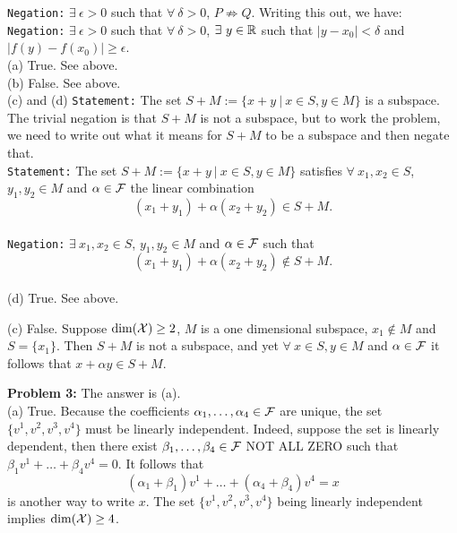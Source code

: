 \documentclass[letterpaper]{article}
\begin{document}
\texttt{Negation:} $ \exists~\epsilon>0$  such that  $\forall~\delta>0$, $P \not \Rightarrow Q$. Writing this out, we have:\\

\texttt{Negation:} $ \exists~\epsilon>0$  such that  $\forall~\delta>0$, $\exists~y\in \mathbb R$ such that $|y-x_0| < \delta$ and  $|f(y)-f(x_0)| \ge \epsilon$.\\

(a) True. See above.\\

(b) False.  See above. \\



(c) and (d)  \texttt{Statement:}  The set $S+M:=\{x+y~|~ x\in S, y \in M\}$ is a subspace. The trivial negation is that $S+M$ is not a subspace, but to work the problem, we need to write out what it means for $S+M$ to be a subspace and then negate that. \\

  \texttt{Statement:}  The set $S+M:=\{x+y~|~ x\in S, y \in M\}$ satisfies $\forall~x_1, x_2 \in S $, $y_1,y_2\in M$ and $\alpha\in {\cal F}$ the linear combination  $$(x_1+y_1) +\alpha (x_2+y_2)  \in S+M.$$\\

   \texttt{Negation:} $\exists~x_1, x_2 \in S $, $y_1,y_2\in M$ and $\alpha\in {\cal F}$ such that $$(x_1+y_1) +\alpha (x_2+y_2) \not \in S+M.$$\\

  (d) True. See above.

(c) False.  Suppose $\dim({\cal X})\ge 2$,  $M$ is a one dimensional subspace, $x_1 \not\in M$ and $S=\{x_1\}$. Then $S+M$ is not a subspace, and yet $ \forall~x \in S, y\in M$ and $\alpha\in {\cal F}$ it follows that $x+\alpha y  \in S+M$.

\bigskip

\bigskip

\noindent \textbf{Problem 3:} The answer is (a). \\

(a) True. Because the coefficients  $\alpha_1, \ldots, \alpha_4 \in {\cal F}$  are unique, the set $\{ v^1, v^2, v^3, v^4\}$ must be linearly independent. Indeed, suppose the set is linearly dependent, then there exist  $\beta_1, \ldots, \beta_4 \in {\cal F}$ NOT ALL ZERO such that $ \beta_1 v^1 + \ldots + \beta_4 v^4 = 0$. It follows that
$$(\alpha_1+\beta_1) v^1 + \ldots +(\alpha_4+ \beta_4) v^4 = x$$
is another way to write $x$.  The set $\{ v^1, v^2, v^3, v^4\}$ being linearly independent implies $\dim({\cal X})\ge 4$.\\
\end{document}
